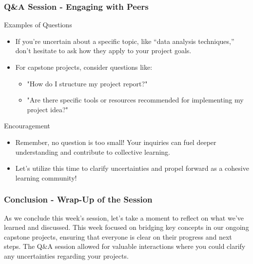 \documentclass[aspectratio=169]{beamer}
\begin{document}
\begin{frame}[fragile]
    \frametitle{Q\&A Session - Engaging with Peers}
    \begin{block}{Examples of Questions}
        \begin{itemize}
            \item If you’re uncertain about a specific topic, like “data analysis techniques,” don’t hesitate to ask how they apply to your project goals.
            \item For capstone projects, consider questions like:
            \begin{itemize}
                \item "How do I structure my project report?"
                \item "Are there specific tools or resources recommended for implementing my project idea?"
            \end{itemize}
        \end{itemize}
    \end{block}
    
    \begin{block}{Encouragement}
        \begin{itemize}
            \item Remember, no question is too small! Your inquiries can fuel deeper understanding and contribute to collective learning.
            \item Let's utilize this time to clarify uncertainties and propel forward as a cohesive learning community!
        \end{itemize}
    \end{block}
\end{frame}

\begin{frame}[fragile]
    \frametitle{Conclusion - Wrap-Up of the Session}
    As we conclude this week’s session, let’s take a moment to reflect on what we’ve learned and discussed. 
    This week focused on bridging key concepts in our ongoing capstone projects, ensuring that everyone is clear on their progress and next steps. 
    The Q\&A session allowed for valuable interactions where you could clarify any uncertainties regarding your projects.
\end{frame}
\end{document}
